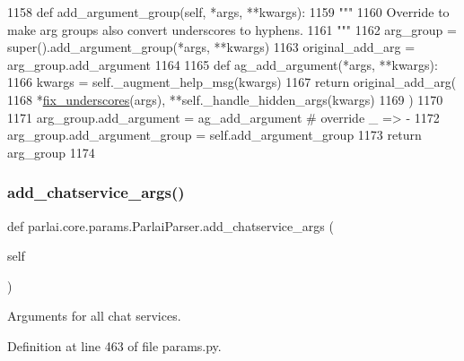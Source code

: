 \begin{DoxyCode}
1158     \textcolor{keyword}{def }add\_argument\_group(self, *args, **kwargs):
1159         \textcolor{stringliteral}{"""}
1160 \textcolor{stringliteral}{        Override to make arg groups also convert underscores to hyphens.}
1161 \textcolor{stringliteral}{        """}
1162         arg\_group = super().add\_argument\_group(*args, **kwargs)
1163         original\_add\_arg = arg\_group.add\_argument
1164 
1165         \textcolor{keyword}{def }ag\_add\_argument(*args, **kwargs):
1166             kwargs = self.\_augment\_help\_msg(kwargs)
1167             \textcolor{keywordflow}{return} original\_add\_arg(
1168                 *\hyperlink{namespaceparlai_1_1core_1_1params_afe2837a1dc21017be30cc7e3cb3696b8}{fix\_underscores}(args), **self.\_handle\_hidden\_args(kwargs)
1169             )
1170 
1171         arg\_group.add\_argument = ag\_add\_argument  \textcolor{comment}{# override \_ => -}
1172         arg\_group.add\_argument\_group = self.add\_argument\_group
1173         \textcolor{keywordflow}{return} arg\_group
1174 
\end{DoxyCode}
\mbox{\label{classparlai_1_1core_1_1params_1_1ParlaiParser_a63d7f06b4e1222783cb5864cf9a7e782}} 
\subsubsection{\texorpdfstring{add\+\_\+chatservice\+\_\+args()}{add\_chatservice\_args()}}
{\footnotesize\ttfamily def parlai.\+core.\+params.\+Parlai\+Parser.\+add\+\_\+chatservice\+\_\+args (\begin{DoxyParamCaption}\item[{}]{self }\end{DoxyParamCaption})}

\begin{DoxyVerb}Arguments for all chat services.
\end{DoxyVerb}
 

Definition at line 463 of file params.\+py.



